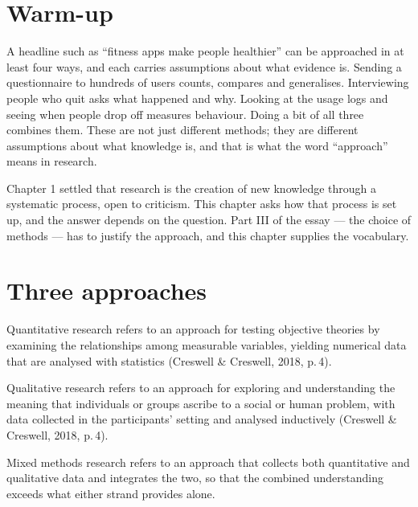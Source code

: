 \documentclass[11pt,a4paper,british,twoside=false,headings=small,chapterprefix=false,numbers=noenddot]{scrbook}
\newenvironment{block}[1]{\begin{tcolorbox}[scriptbox, title={#1}]}{\end{tcolorbox}}
\begin{document}
\section{Warm-up}

A headline such as ``fitness apps make people healthier'' can be approached in at least four ways, and each carries assumptions about what evidence is. Sending a questionnaire to hundreds of users counts, compares and generalises. Interviewing people who quit asks what happened and why. Looking at the usage logs and seeing when people drop off measures behaviour. Doing a bit of all three combines them. These are not just different methods; they are different assumptions about what knowledge is, and that is what the word ``approach'' means in research.

Chapter 1 settled that research is the creation of new knowledge through a systematic process, open to criticism. This chapter asks how that process is set up, and the answer depends on the question. Part III of the essay --- the choice of methods --- has to justify the approach, and this chapter supplies the vocabulary.

\section{Three approaches}

\begin{block}{Quantitative research}
Quantitative research refers to an approach for testing objective theories by examining the relationships among measurable variables, yielding numerical data that are analysed with statistics (Creswell \& Creswell, 2018, p.\,4).
\end{block}
\begin{block}{Qualitative research}
Qualitative research refers to an approach for exploring and understanding the meaning that individuals or groups ascribe to a social or human problem, with data collected in the participants' setting and analysed inductively (Creswell \& Creswell, 2018, p.\,4).
\end{block}
\begin{block}{Mixed methods research}
Mixed methods research refers to an approach that collects both quantitative and qualitative data and integrates the two, so that the combined understanding exceeds what either strand provides alone.
\end{block}
\end{document}
